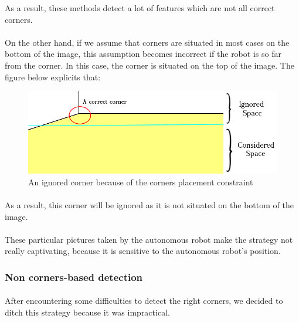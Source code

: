 \documentclass[12pt]{report}
\begin{document}
	 As a result, these methods detect a lot of features which are not all correct corners.
	 
	 \paragraph{}
	 On the other hand, if we assume that corners are situated in most cases on the bottom of the image, this assumption becomes incorrect if the robot is so far from the corner. In this case, the corner is situated on the top of the image. The figure below explicits that:
	 	\begin{figure}[H]
	 	\begin{center}
	 		\includegraphics[scale=0.6]{res/start1_c1.png}
	 		\caption{An ignored corner because of the corners placement constraint}
	 	\end{center}
	 \end{figure}
	 \paragraph{}
	 As a result, this corner will be ignored as it is not situated on the bottom of the image.
	 
	 \paragraph{}
	 These particular pictures taken by the autonomous robot make the strategy not really captivating, because it is sensitive to the autonomous robot's position.
	 
	 \subsubsection{Non corners-based detection}
	 \paragraph{}
	 After encountering some difficulties to detect the right corners, we decided to ditch this strategy because it was impractical. 
	 
\end{document}

